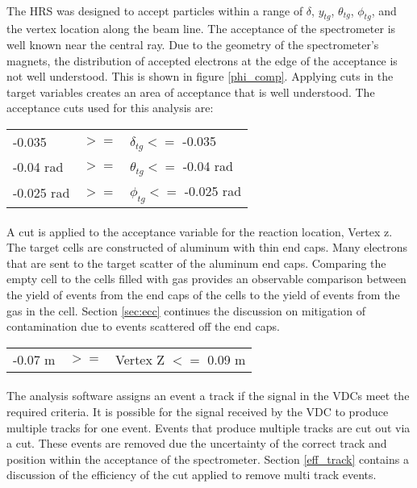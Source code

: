 \paragraph{} The HRS was designed to accept particles within a range of $\delta$, $y_{tg}$, $\theta_{tg}$, $\phi_{tg}$, and the vertex location along the beam line. The acceptance of the spectrometer is well known near the central ray. Due to the geometry of the spectrometer's magnets, the distribution of accepted electrons at the edge of the acceptance is not well understood. This is shown in figure \ref{phi_comp}. Applying cuts in the target variables creates an area of acceptance that is well understood. The acceptance cuts used for this analysis are:

\begin{tabular}{@{$\bullet$ }lll}
-0.035 &$ >=$ &$\delta_{tg} <=$ -0.035\\
-0.04 rad &$>=$  &$\theta_{tg} <=$ -0.04 rad\\
-0.025 rad &$>=$  &$\phi_{tg}   <=$ -0.025 rad
\end{tabular}

\paragraph{}A cut is applied to the acceptance variable for the reaction location, Vertex z. The target cells are constructed of aluminum with thin end caps. Many electrons that are sent to the target scatter of the aluminum end caps. Comparing the empty cell to the cells filled with gas provides an observable comparison between the yield of events from the end caps of the cells to the yield of events from the gas in the cell. Section \ref{sec:ecc} continues the discussion on mitigation of contamination due to events scattered off the end caps.    

\begin{tabular}{@{$\bullet$ }lll}
  -0.07 m &$>=$& Vertex Z $<=$ 0.09 m
\end{tabular}

\paragraph{} The analysis software assigns an event a track if the signal in the VDCs meet the required criteria. It is possible for the signal received by the VDC to produce multiple tracks for one event. Events that produce multiple tracks are cut out via a cut. These events are removed due the uncertainty of the correct track and position within the acceptance of the spectrometer. Section \ref{eff_track} contains a discussion of the efficiency of the cut applied to remove multi track events. 

